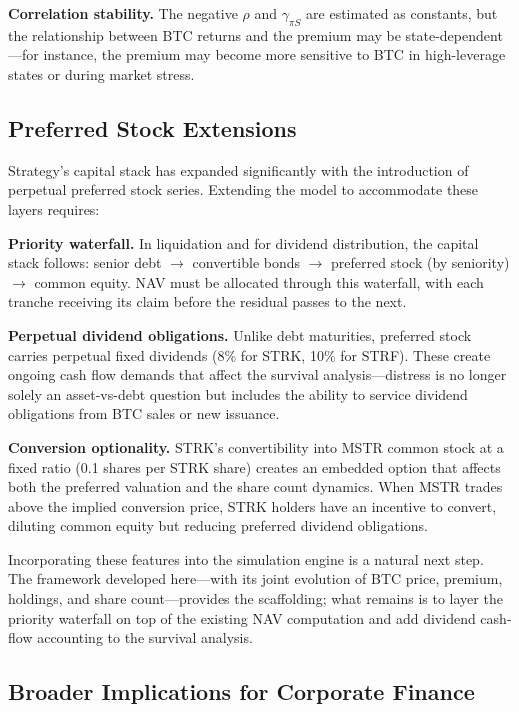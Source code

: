 \textbf{Correlation stability.} The negative $\rho$ and $\gamma_{\pi S}$ are estimated as constants, but the relationship between BTC returns and the premium may be state-dependent---for instance, the premium may become more sensitive to BTC in high-leverage states or during market stress.

\subsection{Preferred Stock Extensions}

Strategy's capital stack has expanded significantly with the introduction of perpetual preferred stock series. Extending the model to accommodate these layers requires:

\textbf{Priority waterfall.} In liquidation and for dividend distribution, the capital stack follows: senior debt $\to$ convertible bonds $\to$ preferred stock (by seniority) $\to$ common equity. NAV must be allocated through this waterfall, with each tranche receiving its claim before the residual passes to the next.

\textbf{Perpetual dividend obligations.} Unlike debt maturities, preferred stock carries perpetual fixed dividends (8\% for STRK, 10\% for STRF). These create ongoing cash flow demands that affect the survival analysis---distress is no longer solely an asset-vs-debt question but includes the ability to service dividend obligations from BTC sales or new issuance.

\textbf{Conversion optionality.} STRK's convertibility into MSTR common stock at a fixed ratio (0.1 shares per STRK share) creates an embedded option that affects both the preferred valuation and the share count dynamics. When MSTR trades above the implied conversion price, STRK holders have an incentive to convert, diluting common equity but reducing preferred dividend obligations.

Incorporating these features into the simulation engine is a natural next step. The framework developed here---with its joint evolution of BTC price, premium, holdings, and share count---provides the scaffolding; what remains is to layer the priority waterfall on top of the existing NAV computation and add dividend cash-flow accounting to the survival analysis.

\subsection{Broader Implications for Corporate Finance}

